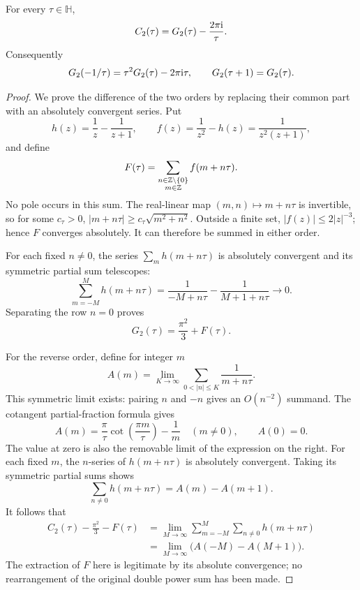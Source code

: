 \begin{theorem}
\label{modular:thm:modular-ordering}
For every \(\tau\in\mathbb H\),
\begin{equation}
C_2(\tau)=G_2(\tau)-\frac{2\pi\mathrm{i}}{\tau}.
\label{modular:eq:modular-anomaly}
\end{equation}
Consequently
\begin{equation}
G_2(-1/\tau)=\tau^2G_2(\tau)-2\pi\mathrm{i}\tau,
\qquad G_2(\tau+1)=G_2(\tau).
\label{modular:eq:modular-G2-transform}
\end{equation}
\end{theorem}

\begin{proof}
We prove the difference of the two orders by replacing their common
part with an absolutely convergent series. Put
\[
h(z)=\frac1z-\frac1{z+1},\qquad
f(z)=\frac1{z^2}-h(z)=\frac1{z^2(z+1)},
\]
and define
\[
F(\tau)=\sum_{\substack{n\in\mathbb{Z}\setminus\{0\}\\m\in\mathbb{Z}}}
                    f(m+n\tau).
\]
No pole occurs in this sum. The real-linear map
\((m,n)\mapsto m+n\tau\) is invertible, so for some \(c_\tau>0\),
\(|m+n\tau|\ge c_\tau\sqrt{m^2+n^2}\).
Outside a finite set, \(|f(z)|\le2|z|^{-3}\); hence \(F\) converges
absolutely. It can therefore be summed in either order.

For each fixed \(n\ne0\), the series \(\sum_m h(m+n\tau)\) is
absolutely convergent and its symmetric partial sum telescopes:
\[
\sum_{m=-M}^{M}h(m+n\tau)
=\frac1{-M+n\tau}-\frac1{M+1+n\tau}\longrightarrow0.
\]
Separating the row \(n=0\) proves
\begin{equation}
G_2(\tau)=\frac{\pi^2}{3}+F(\tau).
\label{modular:eq:modular-G2-absolute-part}
\end{equation}

For the reverse order, define for integer \(m\)
\[
A(m)=\lim_{K\to\infty}
              \sum_{0<|n|\le K}\frac1{m+n\tau}.
\]
This symmetric limit exists: pairing \(n\) and \(-n\) gives an
\(O(n^{-2})\) summand. The cotangent partial-fraction formula gives
\begin{equation}
A(m)=\frac{\pi}{\tau}\cot\!\left(\frac{\pi m}{\tau}\right)-\frac1m
\quad(m\ne0),\qquad A(0)=0.
\label{modular:eq:modular-A-cotangent}
\end{equation}
The value at zero is also the removable limit of the expression on
the right. For each fixed \(m\), the \(n\)-series of \(h(m+n\tau)\)
is absolutely convergent. Taking its symmetric partial sums shows
\[
\sum_{n\ne0}h(m+n\tau)=A(m)-A(m+1).
\]
It follows that
\begin{align*}
C_2(\tau)-\frac{\pi^2}{3}-F(\tau)
&=\lim_{M\to\infty}\sum_{m=-M}^{M}\sum_{n\ne0}h(m+n\tau)\\
&=\lim_{M\to\infty}\bigl(A(-M)-A(M+1)\bigr).
\end{align*}
The extraction of \(F\) here is legitimate by its absolute
convergence; no rearrangement of the original double power sum has
been made.


\end{proof}
